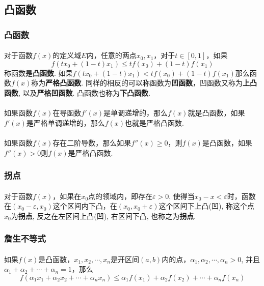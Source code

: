 \subsection{凸函数}

\subsubsection{凸函数}
\paragraph{}
对于函数$f(x)$的定义域$E$内，任意的两点$x_0, x_1$，对于$t \in [0, 1]$，如果
$$
f(t x_0 + (1- t) x_1) \leq t f(x_0) + (1 - t) f(x_1)
$$
称函数是\textbf{凸函数}. 如果$f(t x_0 + (1- t) x_1) < t f(x_0) + (1 - t) f(x_1)$那么函数$f(x)$称为\textbf{严格凸函数}. 同样的相反的可以称函数为\textbf{凹函数}，凹函数又称为\textbf{上凸函数}, 以及\textbf{严格凹函数}. 凸函数也称为\textbf{下凸函数}.

\paragraph{}
如果函数$f(x)$在导函数$f'(x)$是单调递增的，那么$f(x)$就是凸函数，如果$f'(x)$是严格单调递增的，那么$f(x)$也就是严格凸函数.

\paragraph{}
如果函数$f(x)$存在二阶导数，那么如果$f''(x) \geq 0$，则$f(x)$是凸函数，如果$f''(x) > 0$则$f(x)$是严格凸函数.

\subsubsection{拐点}
\paragraph{}
对于函数$f(x)$，如果在$x_0$点的领域内，即存在$\varepsilon > 0$, 使得当$x_0 - x < \varepsilon$时，函数在$(x_0 - \varepsilon, x_0)$这个区间内下凸，在$(x_0, x_0 + \varepsilon)$这个区间下上凸(凹), 称这个点$x_0$为\textbf{拐点}, 反之在左区间上凸(凹), 右区间下凸, 也称之为\textbf{拐点}.

\subsubsection{詹生不等式}
\paragraph{}
如果$f(x)$是凸函数，$x_1, x_2, \cdots, x_n$是开区间$(a, b)$内的点，$\alpha_1, \alpha_2, \cdots, \alpha_n > 0 $, 并且$\alpha_1 + \alpha_2 + \cdots + \alpha_n = 1$，那么
$$
f(\alpha_1 x_1 + \alpha_2 x_2 + \cdots + \alpha_n x_n) \leq \alpha_1 f(x_1) + \alpha_2 f(x_2) + \cdots + \alpha_n f(x_n)
$$

